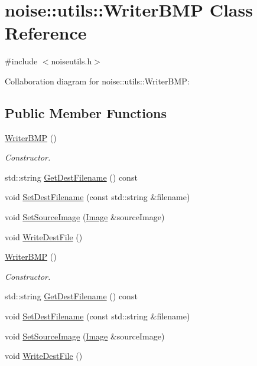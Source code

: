 \hypertarget{classnoise_1_1utils_1_1_writer_b_m_p}{\section{noise\+:\+:utils\+:\+:Writer\+B\+M\+P Class Reference}
\label{classnoise_1_1utils_1_1_writer_b_m_p}
}


{\ttfamily \#include $<$noiseutils.\+h$>$}



Collaboration diagram for noise\+:\+:utils\+:\+:Writer\+B\+M\+P\+:
\subsection*{Public Member Functions}
\begin{DoxyCompactItemize}
\item 
\hyperlink{classnoise_1_1utils_1_1_writer_b_m_p_a384b17e136f6e9ee7d05caaeec724c3e}{Writer\+B\+M\+P} ()
\begin{DoxyCompactList}\small\item\em Constructor. \end{DoxyCompactList}\item 
std\+::string \hyperlink{classnoise_1_1utils_1_1_writer_b_m_p_a5b55373dbe14a19c19532782c15bf764}{Get\+Dest\+Filename} () const 
\item 
void \hyperlink{classnoise_1_1utils_1_1_writer_b_m_p_a02ef2f6be88d1636bac1d3bf0c598393}{Set\+Dest\+Filename} (const std\+::string \&filename)
\item 
void \hyperlink{classnoise_1_1utils_1_1_writer_b_m_p_a62957bc808604c20d0388212777a1b4b}{Set\+Source\+Image} (\hyperlink{classnoise_1_1utils_1_1_image}{Image} \&source\+Image)
\item 
void \hyperlink{classnoise_1_1utils_1_1_writer_b_m_p_adb6cc4cb2b5ce8ba4240ebfd54ad631c}{Write\+Dest\+File} ()
\item 
\hyperlink{classnoise_1_1utils_1_1_writer_b_m_p_a384b17e136f6e9ee7d05caaeec724c3e}{Writer\+B\+M\+P} ()
\begin{DoxyCompactList}\small\item\em Constructor. \end{DoxyCompactList}\item 
std\+::string \hyperlink{classnoise_1_1utils_1_1_writer_b_m_p_a5b55373dbe14a19c19532782c15bf764}{Get\+Dest\+Filename} () const 
\item 
void \hyperlink{classnoise_1_1utils_1_1_writer_b_m_p_a02ef2f6be88d1636bac1d3bf0c598393}{Set\+Dest\+Filename} (const std\+::string \&filename)
\item 
void \hyperlink{classnoise_1_1utils_1_1_writer_b_m_p_a62957bc808604c20d0388212777a1b4b}{Set\+Source\+Image} (\hyperlink{classnoise_1_1utils_1_1_image}{Image} \&source\+Image)
\item 
void \hyperlink{classnoise_1_1utils_1_1_writer_b_m_p_a81f5b2ac820eb23f851a0a7ebd84a146}{Write\+Dest\+File} ()
\end{DoxyCompactItemize}
